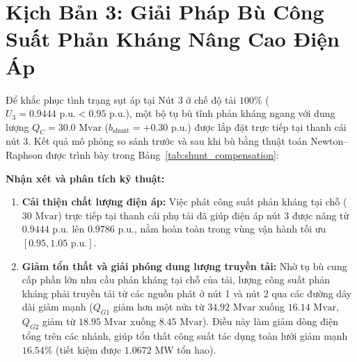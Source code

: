 \documentclass[12pt,a4paper,oneside]{report}
\begin{document}
\section{Kịch Bản 3: Giải Pháp Bù Công Suất Phản Kháng Nâng Cao Điện Áp}
Để khắc phục tình trạng sụt áp tại Nút 3 ở chế độ tải $100\%$ ($U_3 = 0.9444\text{ p.u.} < 0.95\text{ p.u.}$), một bộ tụ bù tĩnh phản kháng ngang với dung lượng $Q_C = 30.0\text{ Mvar}$ ($b_{\text{shunt}} = +0.30\text{ p.u.}$) được lắp đặt trực tiếp tại thanh cái nút 3. Kết quả mô phỏng so sánh trước và sau khi bù bằng thuật toán Newton--Raphson được trình bày trong Bảng~\ref{tab:shunt_compensation}:

\begin{table}[H]
\centering
\caption{Hiệu quả kỹ thuật của giải pháp bù công suất phản kháng tại nút 3 ($Q_C = 30\text{ Mvar}$).}
\label{tab:shunt_compensation}
\end{table}

\noindent \textbf{Nhận xét và phân tích kỹ thuật:}
\begin{enumerate}
    \item \textbf{Cải thiện chất lượng điện áp:} Việc phát công suất phản kháng tại chỗ ($30\text{ Mvar}$) trực tiếp tại thanh cái phụ tải đã giúp điện áp nút 3 được nâng từ $0.9444\text{ p.u.}$ lên $0.9786\text{ p.u.}$, nằm hoàn toàn trong vùng vận hành tối ưu $[0.95, 1.05\text{ p.u.}]$.
    \item \textbf{Giảm tổn thất và giải phóng dung lượng truyền tải:} Nhờ tụ bù cung cấp phần lớn nhu cầu phản kháng tại chỗ của tải, lượng công suất phản kháng phải truyền tải từ các nguồn phát ở nút 1 và nút 2 qua các đường dây dài giảm mạnh ($Q_{G1}$ giảm hơn một nửa từ $34.92\text{ Mvar}$ xuống $16.14\text{ Mvar}$, $Q_{G2}$ giảm từ $18.95\text{ Mvar}$ xuống $8.45\text{ Mvar}$). Điều này làm giảm dòng điện tổng trên các nhánh, giúp tổn thất công suất tác dụng toàn lưới giảm mạnh $16.54\%$ (tiết kiệm được $1.0672\text{ MW}$ tổn hao).
\end{enumerate}
\end{document}
